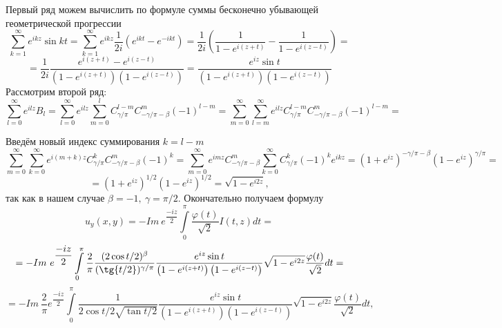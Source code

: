 \documentclass[a4paper, 9pt]{article}
\begin{document}
		Первый ряд можем вычислить по формуле суммы бесконечно убывающей геометрической прогрессии
		\begin{equation*}
			\sum\limits_{k=1}^{\infty} e^{ikz}\sin{kt} =  \sum\limits_{k=1}^{\infty} e^{ikz}\dfrac{1}{2i}\left(e^{ikt} - e^{-ikt}\right) = \dfrac1{2i} \left(\dfrac{1}{1 - e^{i(z+t)}} -  \dfrac{1}{1 - e^{i(z-t)}}\right) = 
		\end{equation*}
		\begin{equation*}
			= \dfrac{1}{2i}  \dfrac{e^{i(z+t)} - e^{i(z-t)}}{\left(1 - e^{i(z+t)} \right) \left(1 - e^{i(z-t)}\right)} =  \dfrac{e^{iz} \sin{t}}{\left(1 - e^{i(z+t)} \right) \left(1 - e^{i(z-t)}\right)}
		\end{equation*}
		Рассмотрим второй ряд:
		\begin{equation*}
			\sum\limits_{l =0 }^{\infty} e^{ilz} B_{l} = \sum\limits_{l =0 }^{\infty} e^{ilz} \sum\limits_{m=0}^{l} C^{l - m}_{\gamma/\pi} C^{m}_{-\gamma/\pi - \beta} (-1)^{l-m} = \sum\limits_{m=0}^{\infty} \sum\limits_{l=m}^{\infty} e^{ilz} C^{l - m}_{\gamma/\pi} C^{m}_{-\gamma/\pi - \beta} (-1)^{l-m} = 
		\end{equation*}
		\par
		Введём новый индекс суммирования $k = l -m$
		\begin{equation*}
			\sum\limits_{m=0}^{\infty} \sum\limits_{k=0}^{\infty} e^{i(m+k)z} C^{k}_{\gamma/\pi} C^{m}_{-\gamma/\pi - \beta} (-1)^{k} = \sum\limits_{m=0}^{\infty} e^{imz} C^{m}_{-\gamma/\pi - \beta} \sum\limits_{k=0}^{\infty}  C^{k}_{\gamma/\pi} (-1)^k e^{ikz} = (1 + e^{iz})^{-\gamma/\pi - \beta} (1- e^{iz})^{\gamma/\pi} =
		\end{equation*}
		\begin{equation*}
			= (1 + e^{iz})^{1/2} (1- e^{iz})^{1/2} =\sqrt{1 - e^{i2z}},
		\end{equation*}
		так как в нашем случае $\beta = -1, \ \gamma = \pi/2$.
		Окончательно получаем формулу
		\begin{equation*}
			u_y(x,y) = - Im\ e^{\dfrac{-iz}{2}} \int\limits_0^\pi \dfrac{\varphi(t)}{\sqrt2} I(t,z) dt =
		\end{equation*}
		\begin{equation*}
			 = - Im\ e^{\dfrac{-iz}{2}} \int\limits_0^\pi \dfrac{2}{\pi}\dfrac{(2\cos{t/2})^\beta}{(\tg{t/2})^{\gamma/\pi}}  \dfrac{e^{iz} \sin{t}}{\left(1 - e^{i(z+t)} \right) \left(1 - e^{i(z-t)}\right)} \sqrt{1 - e^{i2z}} \dfrac{\varphi(t)}{\sqrt2} dt =
		\end{equation*}
		\begin{equation*}
			 = - Im\  \dfrac{2}{\pi} e^{\dfrac{-iz}{2}} \int\limits_0^\pi \dfrac{1}{2\cos{t/2} \sqrt{\tan{t/2}}}  \dfrac{e^{iz} \sin{t}}{\left(1 - e^{i(z+t)} \right) \left(1 - e^{i(z-t)}\right)} \sqrt{1 - e^{i2z}} \dfrac{\varphi(t)}{\sqrt2} dt, 
		\end{equation*}
\end{document}
